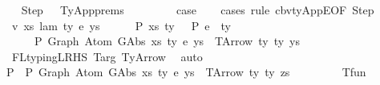 \begin{isabellebody}
\ \ \isamarkupfalse%
\ Step\ \ {\isacharequal}{\kern0pt}\ TyApp{\isachardot}{\kern0pt}prems\ \ \ \ \ \isanewline
\isanewline
\ \ \isamarkupfalse%
\ {\isacharquery}{\kern0pt}case\isanewline
\ \ \isamarkupfalse%
\ {\isacharparenleft}{\kern0pt}cases\ rule{\isacharcolon}{\kern0pt}\ cbv{\isacharunderscore}{\kern0pt}ty{\isacharunderscore}{\kern0pt}AppE{\isacharbrackleft}{\kern0pt}OF\ Step{\isacharbrackright}{\kern0pt}{\isacharparenright}{\kern0pt}\isanewline
\ \ \ \ \isamarkupfalse%
\ {\isacharparenleft}{\kern0pt}{}\ v\ xs\ lam\ ty\ e\ ys{\isacharparenright}{\kern0pt}\isanewline
\isanewline
\ \ \ \ \isamarkupfalse%
\ P{}{\isacharcolon}{\kern0pt}\ {\isachardoublequoteopen}{\isacharparenleft}{\kern0pt}xs{\isacharcomma}{\kern0pt}\ ty{}{\isacharparenright}{\kern0pt}\ {\isacharhash}{\kern0pt}\ {\isasymGamma}\ {\isasymturnstile}{\isacharbraceleft}{\kern0pt}P{\isacharbraceright}{\kern0pt}\ e\ {\isacharcolon}{\kern0pt}\ ty{}\ {\isacharequal}{\kern0pt}{\isacharequal}{\kern0pt}{\isachargreater}{\kern0pt}\isanewline
\ \ \ \ \ {\isasymGamma}\ {\isasymturnstile}{\isacharbraceleft}{\kern0pt}P{\isacharbraceright}{\kern0pt}\ Graph\ {\isacharparenleft}{\kern0pt}Atom\ {\isacharparenleft}{\kern0pt}GAbs\ xs\ ty{}\ e{\isacharparenright}{\kern0pt}\ ys{\isacharparenright}{\kern0pt}\ {\isacharcolon}{\kern0pt}\ TArrow\ ty{}\ ty{}\ ys{\isachardoublequoteclose}\isanewline
\ \ \ \ \ \ \isamarkupfalse%
\ {\isachardoublequoteopen}{}{\isachardoublequoteclose}{\isacharparenleft}{\kern0pt}{}{\isacharcomma}{\kern0pt}{}{\isacharcomma}{\kern0pt}{}{\isacharparenright}{\kern0pt}\ FL{\isacharunderscore}{\kern0pt}typing{\isacharunderscore}{\kern0pt}LRHS\ T{\isacharunderscore}{\kern0pt}arg\ TyArrow\ \isamarkupfalse%
\ auto\isanewline
\isanewline
\ \ \ \ \isamarkupfalse%
\ P{}{\isacharcolon}{\kern0pt}\ {\isachardoublequoteopen}{\isasymGamma}\ {\isasymturnstile}{\isacharbraceleft}{\kern0pt}P{\isacharbraceright}{\kern0pt}\ Graph\ {\isacharparenleft}{\kern0pt}Atom\ {\isacharparenleft}{\kern0pt}GAbs\ xs\ ty\ e{\isacharparenright}{\kern0pt}\ ys{\isacharparenright}{\kern0pt}\ {\isacharcolon}{\kern0pt}\ TArrow\ ty{}\ ty{}\ zs{\isachardoublequoteclose}\isanewline
\ \ \ \ \ \ \isamarkupfalse%
\ {\isachardoublequoteopen}{}{\isachardoublequoteclose}{\isacharparenleft}{\kern0pt}{}{\isacharparenright}{\kern0pt}\ T{\isacharunderscore}{\kern0pt}fun\isanewline

\end{isabellebody}
